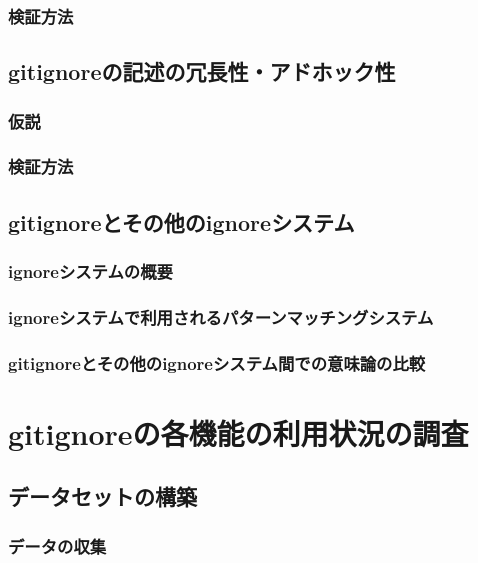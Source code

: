 \documentclass[a4paper,xelatex,ja=standard,fontsize=11pt]{bxjsreport}
\begin{document}
\subsection{検証方法}

\section{\textrm{gitignore}の記述の冗長性・アドホック性}

\subsection{仮説}

\subsection{検証方法}

\section{\textrm{gitignore}とその他の\textrm{ignore}システム}

\subsection{\textrm{ignore}システムの概要}

\subsection{\textrm{ignore}システムで利用されるパターンマッチングシステム}

\subsection{\textrm{gitignore}とその他の\textrm{ignore}システム間での意味論の比較}

%
\chapter{\textrm{gitignore}の各機能の利用状況の調査}

\section{データセットの構築}

\subsection{データの収集}
\end{document}
